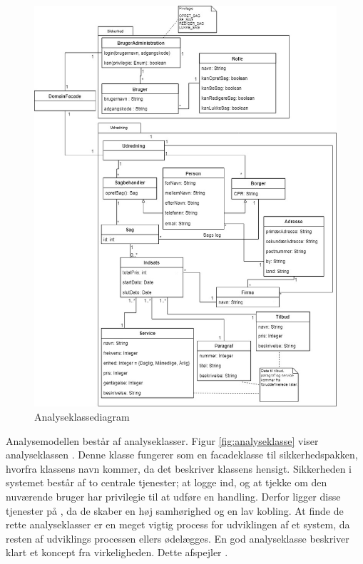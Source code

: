 \documentclass[../../main.tex]{subfiles}
\begin{document}
\begin{figure}[H]
  \centering
  \includegraphics[scale=.38]{figurer/analysemodel.jpg}
  \caption{Analyseklassediagram}
  \label{fig:analysemodel}
\end{figure}

Analysemodellen består af analyseklasser. Figur \ref{fig:analyseklasse} viser analyseklassen . Denne klasse fungerer som en facadeklasse til sikkerhedspakken, hvorfra klassens navn kommer, da det beskriver klassens hensigt. Sikkerheden i systemet består af to centrale tjenester; at logge ind, og at tjekke om den nuværende bruger har privilegie til at udføre en handling. Derfor ligger disse tjenester på , da de skaber en høj samhørighed og en lav kobling. At finde de rette analyseklasser er en meget vigtig process for udviklingen af et system, da resten af udviklings processen ellers ødelægges. En god analyseklasse beskriver klart et koncept fra virkeligheden. Dette afspejler .
\end{document}

